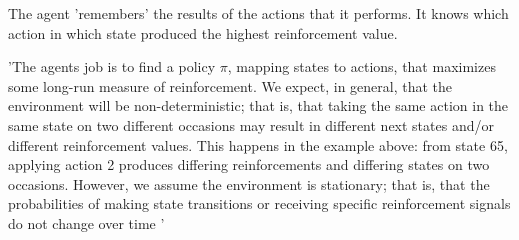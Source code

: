 The agent 'remembers' the results of the actions that it performs. It knows which action in which state produced the highest reinforcement value.

'The agents job is to find a policy $\pi$, mapping states to actions, that maximizes some long-run measure of reinforcement. We expect, in general, that the environment will be non-deterministic; that is, that taking the same action in the same state on two different occasions may result in different next states and/or different reinforcement values. This happens in the example above: from state 65, applying action 2 produces differing reinforcements and differing states on two occasions. However, we assume the environment is stationary; that is, that the probabilities of making state transitions or receiving specific reinforcement signals do not change over time ' \cite{KaelblingLittmanMoore1996}

